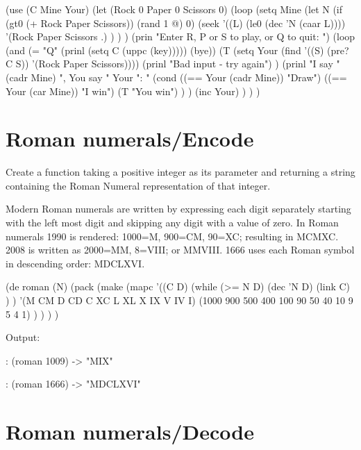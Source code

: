 \begin{wideverbatim}

(use (C Mine Your)
   (let (Rock 0  Paper 0  Scissors 0)
      (loop
         (setq Mine
            (let N (if (gt0 (+ Rock Paper Scissors)) (rand 1 @) 0)
               (seek
                  '((L) (le0 (dec 'N (caar L))))
                  '(Rock Paper Scissors .) ) ) )
         (prin "Enter R, P or S to play, or Q to quit: ")
         (loop
            (and (= "Q" (prinl (setq C (uppc (key))))) (bye))
            (T (setq Your (find '((S) (pre? C S)) '(Rock Paper Scissors))))
            (prinl "Bad input - try again") )
         (prinl
            "I say " (cadr Mine) ", You say " Your ": "
            (cond
               ((== Your (cadr Mine)) "Draw")
               ((== Your (car Mine)) "I win")
               (T "You win") ) )
         (inc Your) ) ) )

\end{wideverbatim}

\pagebreak{}
\section*{Roman numerals/Encode}

Create a function taking a positive integer as its parameter and
returning a string containing the Roman Numeral representation of that
integer.

Modern Roman numerals are written by expressing each digit separately
starting with the left most digit and skipping any digit with a value of
zero. In Roman numerals 1990 is rendered: 1000=M, 900=CM, 90=XC;
resulting in MCMXC. 2008 is written as 2000=MM, 8=VIII; or MMVIII. 1666
uses each Roman symbol in descending order: MDCLXVI.

\begin{wideverbatim}

(de roman (N)
   (pack
      (make
         (mapc
            '((C D)
               (while (>= N D)
                  (dec 'N D)
                  (link C) ) )
            '(M CM D CD C XC L XL X IX V IV I)
            (1000 900 500 400 100 90 50 40 10 9 5 4 1) ) ) ) )

Output:

: (roman 1009)
-> "MIX"

: (roman 1666)
-> "MDCLXVI"

\end{wideverbatim}

\pagebreak{}
\section*{Roman numerals/Decode}

